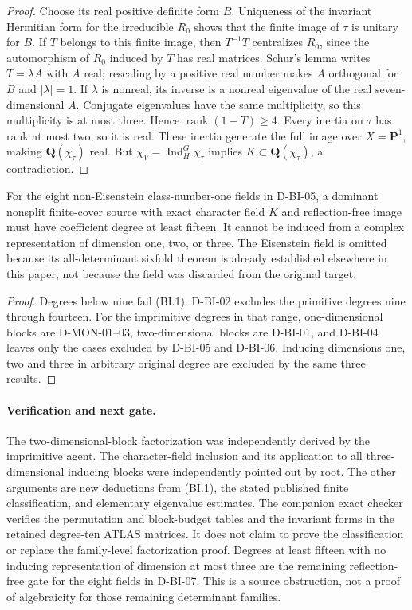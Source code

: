 \begin{proof}
Choose its real positive definite form $B$.  Uniqueness of the
invariant Hermitian form for the irreducible $R_0$ shows that the
finite image of $\tau$ is unitary for $B$.  If $T$ belongs to
this finite image, then $T^{-1}\bar T$ centralizes $R_0$, since the automorphism
of $R_0$ induced by $T$ has real matrices.  Schur's lemma writes
$T=\lambda A$ with $A$ real; rescaling by a positive real number
makes $A$ orthogonal for $B$ and $|\lambda|=1$.
If $\lambda$ is nonreal, its inverse is a nonreal eigenvalue of
the real seven-dimensional $A$.  Conjugate eigenvalues have the
same multiplicity, so this multiplicity is at most three.  Hence
$\operatorname{rank}(1-T)\ge4$.  Every inertia on $\tau$ has rank
at most two, so it is real.  These inertia generate the full image
over $X=\mathbf P^1$, making $\mathbf Q(\chi_\tau)$ real.
But $\chi_V=\operatorname{Ind}_H^G\chi_\tau$ implies
$K\subset\mathbf Q(\chi_\tau)$, a contradiction.
\end{proof}

\begin{corollary}
\label{D-BI-07}
For the eight non-Eisenstein class-number-one fields in D-BI-05,
a dominant nonsplit finite-cover source with exact character field
$K$ and reflection-free image must have coefficient degree at least
fifteen.  It cannot be induced from a complex representation of
dimension one, two, or three.  The Eisenstein field is omitted
because its all-determinant sixfold theorem is already established
elsewhere in this paper, not because the field was discarded from
the original target.
\end{corollary}
\begin{proof}
Degrees below nine fail (BI.1).  D-BI-02 excludes the primitive
degrees nine through fourteen.  For the imprimitive degrees in
that range, one-dimensional blocks are D-MON-01--03,
two-dimensional blocks are D-BI-01, and D-BI-04 leaves only
the cases excluded by D-BI-05 and D-BI-06.  Inducing dimensions
one, two and three in arbitrary original degree are excluded by
the same three results.
\end{proof}

\paragraph{Verification and next gate.}
The two-dimensional-block factorization was independently derived
by the imprimitive agent.  The character-field inclusion and its
application to all three-dimensional inducing blocks were independently
pointed out by root.  The other arguments are new deductions from
(BI.1), the stated published finite classification, and elementary
eigenvalue estimates.  The companion exact checker verifies the
permutation and block-budget tables and the invariant forms in the
retained degree-ten ATLAS matrices.  It does not claim to prove the
classification or replace the family-level factorization proof.
Degrees at least fifteen with no inducing representation of dimension
at most three are the remaining reflection-free gate for the eight
fields in D-BI-07.  This is a source obstruction, not a proof of
algebraicity for those remaining determinant families.
